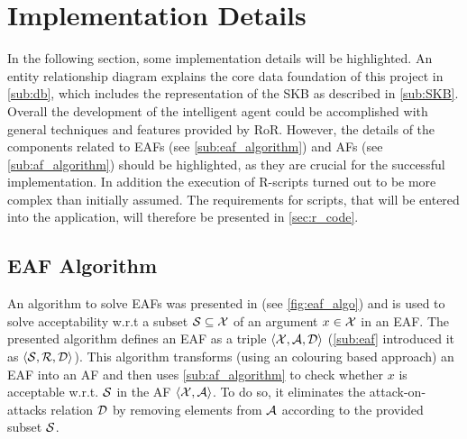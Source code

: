 \section{Implementation Details}
\label{sec:implementation}
In the following section, some implementation details will be highlighted. An entity relationship diagram explains the core data foundation of this project in \autoref{sub:db}, which includes the representation of the \gls{SKB} as described in \autoref{sub:SKB}. Overall the development of the intelligent agent could be accomplished with general techniques and features provided by \gls{RoR}. However, the details of the components related to \glspl{EAF} (see \autoref{sub:eaf_algorithm}) and \glspl{AF} (see \autoref{sub:af_algorithm}) should be highlighted, as they are crucial for the successful implementation. In addition the execution of \gls{R}-scripts turned out to be more complex than initially assumed. The requirements for scripts, that will be entered into the application, will therefore be presented in \autoref{sec:r_code}.
	




\subsection{\Gls{EAF} Algorithm}
\label{sub:eaf_algorithm}
	
An algorithm to solve \glspl{EAF} was presented in \cite{Dunne10computationin} (see \autoref{fig:eaf_algo}) and is used to solve acceptability w.r.t a subset $\S \subseteq \X$ of an argument $x \in \X$ in an \gls{EAF}. The presented algorithm defines an \gls{EAF} as a triple $\langle \X, \A, \D \rangle$ (\autoref{sub:eaf} introduced it as $\langle \S, \R, \D \rangle$).
This algorithm transforms (using an colouring based approach) an \gls{EAF} into an \gls{AF} and then uses \autoref{sub:af_algorithm}  to check whether $x$ is acceptable w.r.t. $\S$ in the AF $\langle \X, \A \rangle$. To do so, it eliminates the attack-on-attacks relation $\D$ by removing elements from $\A$ according to the provided subset $\S$.


